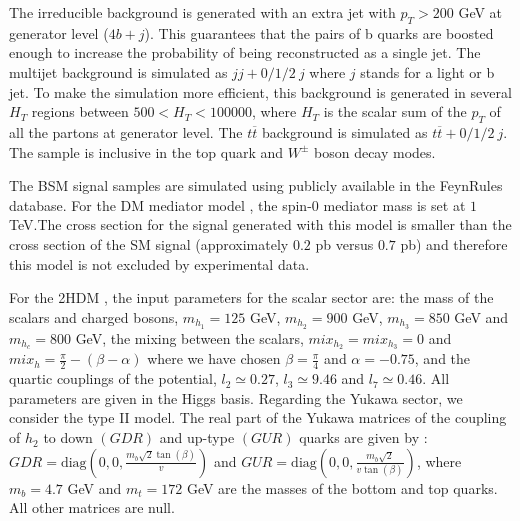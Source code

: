 The irreducible background is generated with an extra jet with $p_T>200$ GeV at generator level ($4b+j$). This guarantees that the pairs of b quarks are boosted enough to increase the probability of being reconstructed as a single jet. The multijet background is simulated as $jj+0/1/2~j$ where $j$ stands for a light or b jet. To make the simulation more efficient, this background is generated in several $H_T$ regions between $500<H_T<100000$, where $H_T$ is the scalar sum of the $p_T$ of all the partons at generator level. The $t\overline{t}$ background is simulated as $t\overline{t}+0/1/2~j$. The sample is inclusive in the top quark and $W^{\pm}$ boson decay modes.

The BSM signal samples are simulated using publicly available in the FeynRules database. For the DM mediator model \cite{DM}, the spin-$0$ mediator mass is set at $1$ TeV.The cross section for the signal
generated with this model is smaller than the cross section of the SM signal (approximately $0.2$ pb versus $0.7$ pb) and therefore this model is not excluded by experimental data. 

For the 2HDM \cite{2HDM,2HDM1}, the input parameters for the scalar sector are: the mass of the scalars and charged bosons, $m_{h_1}=125$ GeV, $m_{h_2}=900$ GeV, $m_{h_3}=850$ GeV and $m_{h_c}=800$ GeV, the mixing between the scalars, $mix_{h_2}=mix_{h_3}=0$ and $mix_h=\frac{\pi}{2}-(\beta-\alpha)$ where we have chosen $\beta=\frac{\pi}{4}$ and $\alpha=-0.75$, and the quartic couplings of the potential, $l_2\simeq0.27$, $l_3\simeq9.46$ and $l_7\simeq0.46$. All parameters are given in the Higgs basis. Regarding the Yukawa sector, we consider the type II model. The real part of the Yukawa matrices of the coupling of $h_2$ to down $(GDR)$ and up-type $(GUR)$ quarks are given by \cite{2HDM}: $GDR=\text{diag}\left(0,0,\frac{m_b\sqrt{2}\tan(\beta)}{v}\right)$ and $GUR=\text{diag}\left(0,0,\frac{m_b\sqrt{2}}{v\tan(\beta)}\right)$, where $m_b=4.7$ GeV and $m_t=172$ GeV are the masses of the bottom and top quarks. All other matrices are null.  

